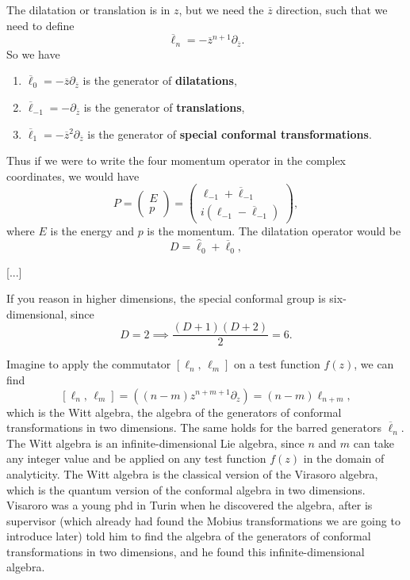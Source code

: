 The dilatation or translation is in \(z\), but we need the \(\overline{z}\) direction, such that we need to define
\[
    \overline{\ell}_n = - \overline{z}^{n + 1} \partial_{\overline{z}}.
\]
So we have
\begin{enumerate}
    \item \(\overline{\ell}_0 = -\overline{z} \partial_{\overline{z}}\) is the generator of \textbf{dilatations},
    \item \(\overline{\ell}_{-1} = -\partial_{\overline{z}}\) is the generator of \textbf{translations},
    \item \(\overline{\ell}_1 = -\overline{z}^2 \partial_{\overline{z}}\) is the generator of \textbf{special conformal transformations}.
\end{enumerate}

Thus if we were to write the four momentum operator in the complex coordinates, we would have
\[
    P = \begin{pmatrix}
        E \\
        p
    \end{pmatrix} = \begin{pmatrix}
        \ell_{-1} + \overline{\ell}_{-1} \\
        i(\ell_{-1} - \overline{\ell}_{-1})
    \end{pmatrix},
\]
where \(E\) is the energy and \(p\) is the momentum. The dilatation operator would be
\[
    D = \hat{\ell}_0 + \overline{\ell}_0,
\]

[...]

If you reason in higher dimensions, the special conformal group is six-dimensional, since
\[
    D=2 \implies \frac{(D+1)(D+2)}{2} = 6.
\]

Imagine to apply the commutator \(\left[ \ell_n, \, \ell_m \right]\) on a test function \(f(z)\), we can find
\[
    \left[ \ell_n, \, \ell_m \right] = \left( (n - m) z^{n + m + 1} \partial_z \right) = (n - m) \ell_{n + m},
\]
which is the Witt algebra, the algebra of the generators of conformal transformations in two dimensions. The same holds for the barred generators \(\overline{\ell}_n\). The Witt algebra is an infinite-dimensional Lie algebra, since \(n\) and \(m\) can take any integer value and be applied on any test function \(f(z)\) in the domain of analyticity. The Witt algebra is the classical version of the Virasoro algebra, which is the quantum version of the conformal algebra in two dimensions. Visaroro was a young phd in Turin when he discovered the algebra, after is supervisor (which already had found the Mobius transformations we are going to introduce later) told him to find the algebra of the generators of conformal transformations in two dimensions, and he found this infinite-dimensional algebra.

